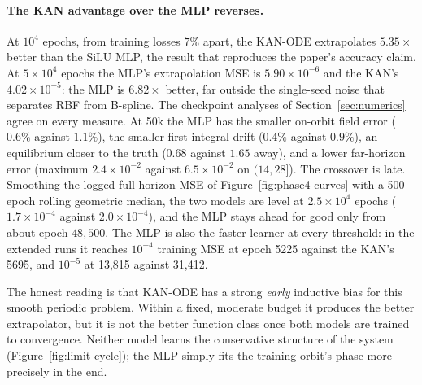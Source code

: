 \paragraph{The KAN advantage over the MLP reverses.} At $10^4$ epochs, from
training losses $7\%$ apart, the KAN-ODE extrapolates $5.35\times$ better
than the SiLU MLP, the result that reproduces the paper's accuracy claim. At
$5\times10^4$ epochs the MLP's extrapolation MSE is $5.90\times10^{-6}$ and
the KAN's $4.02\times10^{-5}$: the MLP is $6.82\times$ better, far outside
the single-seed noise that separates RBF from B-spline. The checkpoint
analyses of Section~\ref{sec:numerics} agree on every measure. At 50k the MLP
has the smaller on-orbit field error ($0.6\%$ against $1.1\%$), the smaller
first-integral drift ($0.4\%$ against $0.9\%$), an equilibrium closer to the
truth ($0.68$ against $1.65$ away), and a lower far-horizon error
(maximum $2.4\times10^{-2}$ against $6.5\times10^{-2}$ on $(14,28]$). The
crossover is late. Smoothing the logged full-horizon MSE of
Figure~\ref{fig:phase4-curves} with a 500-epoch rolling geometric median,
the two models are level at $2.5\times10^4$
epochs ($1.7\times10^{-4}$ against $2.0\times10^{-4}$), and the MLP stays
ahead for good only from about epoch $48{,}500$. The MLP is also the faster
learner at every threshold: in the extended runs it reaches $10^{-4}$
training MSE at epoch 5225 against the KAN's 5695, and $10^{-5}$ at 13{,}815
against 31{,}412.

The honest reading is that KAN-ODE has a strong \emph{early} inductive bias
for this smooth periodic problem. Within a fixed, moderate budget it produces
the better extrapolator, but it is not the better function class once both
models are trained to convergence. Neither model learns the conservative
structure of the system (Figure~\ref{fig:limit-cycle}); the MLP simply fits
the training orbit's phase more precisely in the end.

